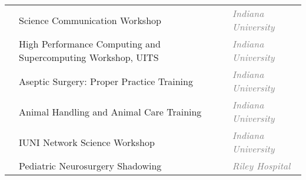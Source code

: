 \documentclass[11pt]{cooperCV_v1/cooperCV} %
\begin{document}
\begin{minipage}{\textwidth}
\begin{tabular}{ @{} p{} p{} p{} @{} }
  \small & {\small Science Communication Workshop} & \hfill {\small \textcolor{gray}{{\emph{Indiana University}}}} \\
  
  \small & {\small High Performance Computing and Supercomputing Workshop, UITS} & \hfill {\small \textcolor{gray}{{\emph{Indiana University}}}} \\
  
  \small & {\small Aseptic Surgery: Proper Practice Training} & \hfill {\small \textcolor{gray}{{\emph{Indiana University}}}} \\
  
  \small & {\small Animal Handling and Animal Care Training} & \hfill {\small \textcolor{gray}{{\emph{Indiana University}}}} \\
  
  \small & {\small IUNI Network Science Workshop} & \hfill {\small \textcolor{gray}{{\emph{Indiana University}}}} \\
  
  \small & {\small Pediatric Neurosurgery Shadowing} & \hfill {\small \textcolor{gray}{{\emph{Riley Hospital}}}} \\
  
\end{tabular}



\end{minipage}





%


\selectfont
\end{document}
